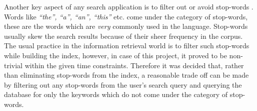 \documentclass[letterpaper,twocolumn,10pt]{article}
\begin{document}
Another key aspect of any search application is to filter out or avoid stop-words
. Words like \textit{``the'', ``a'', ``an'', ``this''} etc. come under the
category of stop-words, these are the words which are \emph{very} commonly used
in the
language. Stop-words usually skew the search results because of their sheer
frequency in the corpus. The usual practice in the information retrieval world
is to filter such stop-words while building the index, however, in case of this
project, it proved to be non-trivial within the given time constraints.
Therefore it was decided that, rather than eliminating stop-words from the index,
a reasonable trade off can be made by filtering out any stop-words from the
user's search query and querying the database for only the keywords which do
not come under the category of stop-words. \\
\end{document}
